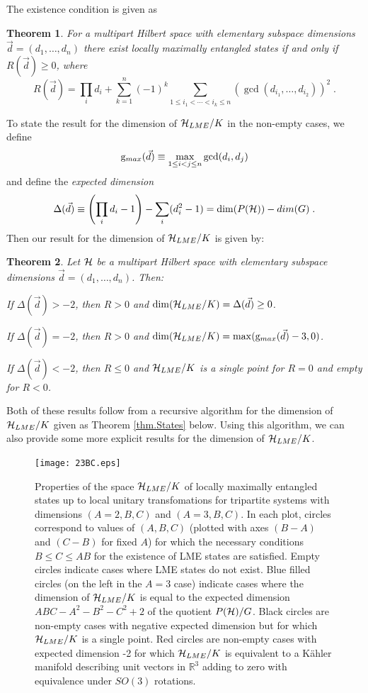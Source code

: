 \documentclass[12pt]{article}
\newtheorem{theorem}{Theorem}[section]
\theoremstyle{definition}
\newcommand{\be}{\begin{equation}}
\newcommand{\ee}{\end{equation}}
\begin{document}
The existence condition is given as
\begin{theorem}\label{thm.R}
For a multipart Hilbert space with elementary subspace dimensions $\vec{d} = (d_1, \dots, d_n)$ there exist locally maximally entangled states if and only if $R(\vec{d}) \ge 0$, where
\be
R(\vec{d}) = \prod_i d_i + \sum_{k=1}^n (-1)^k \sum_{1 \le i_1 < \cdots < i_k \le n} (\gcd(d_{i_1},\dots,d_{i_2}))^2 \; .
\ee
\end{theorem}
To state the result for the dimension of ${\cal H}_{LME}/K$ in the non-empty cases,  we define
\be
\label{gmd}
{\rm g}_{max}(\vec{d}) \equiv \max_{1 \le i < j \le n} \gcd(d_i,d_j)
\ee
and define the {\it expected dimension}
\be
\Delta(\vec{d}) \equiv \left(\prod_i d_i - 1\right) - \sum_i (d_i^2 - 1) = \dim(P({\cal H})) - dim(G) \; .
\ee
Then our result for the dimension of ${\cal H}_{LME}/K$ is given by:
\begin{theorem}\label{thm.dims}
Let ${\cal H}$ be a multipart Hilbert space with elementary subspace dimensions $\vec{d} = (d_1, \dots, d_n)$. Then:

If $\Delta(\vec{d}) > -2$, then $R > 0$ and $\dim({\cal H}_{LME}/K) = \Delta(\vec{d}) \ge 0$.

If $\Delta(\vec{d}) = -2$, then $R > 0$ and $\dim({\cal H}_{LME}/K)  = \max ({\rm g}_{max}(\vec{d}) -3,0)$.

If $\Delta(\vec{d}) < -2$, then $R \le 0$ and ${\cal H}_{LME}/K$ is a single point for $R=0$ and empty for $R<0$.
\end{theorem}

Both of these results follow from a recursive algorithm for the dimension of ${\cal H}_{LME}/K$ given as Theorem \ref{thm.States} below. Using this algorithm, we can also provide some more explicit results
for the dimension of ${\cal H}_{LME}/K$.


\begin{figure}
\centering
\texttt{[image: 23BC.eps]}
\caption{Properties of the space ${\cal H}_{LME}/K$ of locally maximally entangled states up to local unitary transfomations for tripartite systems with dimensions $(A=2,B,C)$ and $(A=3,B,C)$. In each plot, circles correspond to values of $(A,B,C)$ (plotted with axes $(B-A)$ and $(C-B)$ for fixed $A$) for which the necessary conditions $B \le C \le AB$ for the existence of LME states are satisfied. Empty circles indicate cases where LME states do not exist. Blue filled circles (on the left in the $A=3$ case) indicate cases where the dimension of ${\cal H}_{LME}/K$ is equal to the expected dimension $ABC - A^2 - B^2 - C^2 + 2$ of the quotient $P({\cal H})/G$. Black circles are non-empty cases with negative expected dimension but for which ${\cal H}_{LME}/K$ is a single point. Red circles are non-empty cases with expected dimension -2 for which ${\cal H}_{LME}/K$ is equivalent to a K\"ahler manifold describing unit vectors in $\mathbb{R}^3$ adding to zero with equivalence under $SO(3)$ rotations.}
\label{fig:23BC}
\end{figure}
\end{document}
